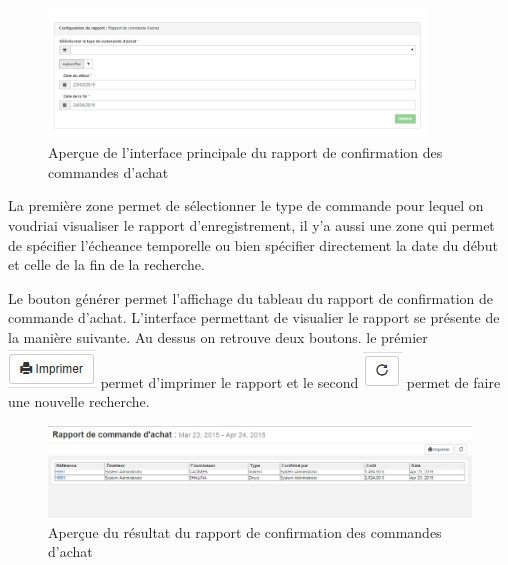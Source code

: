 \documentclass[12pt,a4paper]{report}
\begin{document}
\begin{figure}[h]
\begin{center}
\includegraphics[width=10cm]{pic/RapConfPO.png}
\end{center}
\caption{Aperçue de l'interface principale du rapport de confirmation des commandes d'achat}
\label{Aperçue de l'interface principale du rapport de confirmation des commandes d'achat}
\end{figure}


La première zone permet de sélectionner le type de commande pour lequel on voudriai visualiser le rapport d'enregistrement, il y'a aussi une zone qui permet de spécifier l'écheance temporelle  ou bien spécifier directement la date du début et celle de la fin de la recherche. 

Le bouton générer permet l'affichage du tableau du rapport de confirmation de commande d'achat. L'interface permettant de visualier le rapport se présente de la manière suivante. Au dessus on retrouve deux boutons. le prémier 
\includegraphics[scale=0.7]{pic/Print.png} permet d'imprimer le rapport et le second \includegraphics[scale=0.7]{pic/refresh.png} permet de faire une nouvelle recherche.

\begin{figure}[h]
\begin{center}
\includegraphics[width=12cm]{pic/RapportCommAchat.png}
\end{center}
\caption{Aperçue du résultat du rapport de confirmation des commandes d'achat}
\label{Aperçue du résultat du rapport de confirmation des commandes d'achat}
\end{figure}
\end{document}
